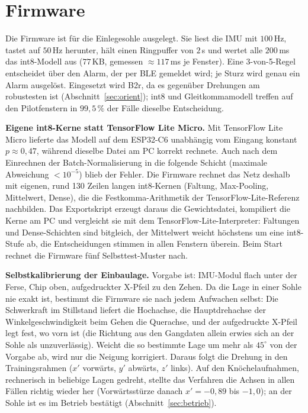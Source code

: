 \documentclass[11pt,a4paper,oneside,parskip=half,open=any,
               numbers=noenddot,listof=totoc,bibliography=totoc]{scrreprt}
\begin{document}
\section{Firmware}
Die Firmware ist für die Einlegesohle ausgelegt. Sie liest die IMU mit
$100$\,Hz, tastet auf $50$\,Hz herunter, hält einen Ringpuffer von $2$\,s
und wertet alle $200$\,ms das int8-Modell aus ($77$\,KB, gemessen
$\approx 117$\,ms je Fenster). Eine 3-von-5-Regel entscheidet über den
Alarm, der per BLE gemeldet wird; je Sturz wird genau ein Alarm
ausgelöst. Eingesetzt wird B2r, da es gegenüber Drehungen am
robustesten ist (Abschnitt~\ref{sec:orient}); int8 und Gleitkommamodell
treffen auf den Pilotfenstern in $99{,}5\,\%$ der Fälle dieselbe
Entscheidung.

\textbf{Eigene int8-Kerne statt TensorFlow Lite Micro.} Mit TensorFlow
Lite Micro lieferte das Modell auf dem ESP32-C6 unabhängig vom Eingang
konstant $p \approx 0{,}47$, während dieselbe Datei am PC korrekt
rechnete. Auch nach dem Einrechnen der Batch-Normalisierung in die
folgende Schicht (maximale Abweichung $< 10^{-5}$) blieb der Fehler.
Die Firmware rechnet das Netz deshalb mit eigenen, rund 130 Zeilen
langen int8-Kernen (Faltung, Max-Pooling, Mittelwert, Dense), die die
Festkomma-Arithmetik der TensorFlow-Lite-Referenz nachbilden. Das
Exportskript erzeugt daraus die Gewichtsdatei, kompiliert die Kerne am
PC und vergleicht sie mit dem TensorFlow-Lite-Interpreter: Faltungen und
Dense-Schichten sind bitgleich, der Mittelwert weicht höchstens um eine
int8-Stufe ab, die Entscheidungen stimmen in allen Fenstern überein.
Beim Start rechnet die Firmware fünf Selbsttest-Muster nach.

\textbf{Selbstkalibrierung der Einbaulage.} Vorgabe ist: IMU-Modul flach
unter der Ferse, Chip oben, aufgedruckter X-Pfeil zu den Zehen. Da die
Lage in einer Sohle nie exakt ist, bestimmt die Firmware sie nach jedem
Aufwachen selbst: Die Schwerkraft im Stillstand liefert die Hochachse,
die Hauptdrehachse der Winkelgeschwindigkeit beim Gehen die Querachse,
und der aufgedruckte X-Pfeil legt fest, wo vorn ist (die Richtung aus
den Gangdaten allein erwies sich an der Sohle als unzuverlässig). Weicht
die so bestimmte Lage um mehr als $45^{\circ}$ von der Vorgabe ab, wird
nur die Neigung korrigiert. Daraus folgt die Drehung in den
Trainingsrahmen ($x'$ vorwärts, $y'$ abwärts, $z'$ links). Auf den
Knöchelaufnahmen, rechnerisch in beliebige Lagen gedreht, stellte das
Verfahren die Achsen in allen Fällen richtig wieder her
(Vorwärtsstürze danach $x' = -0{,}89$ bis $-1{,}0$); an der Sohle ist es
im Betrieb bestätigt (Abschnitt~\ref{sec:betrieb}).
\end{document}
